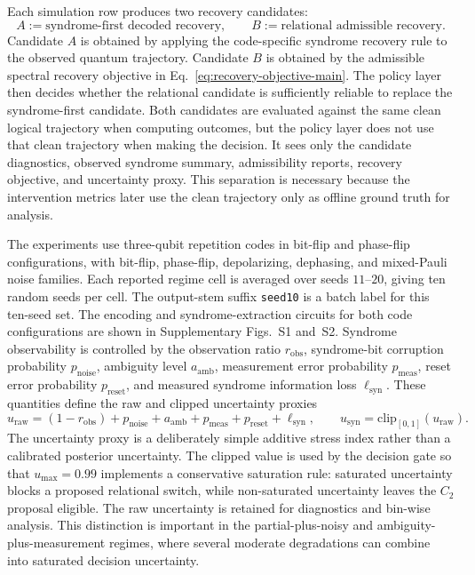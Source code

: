 \documentclass{iopjournal}
\begin{document}
Each simulation row produces two recovery candidates:
\begin{equation}
A := \text{syndrome-first decoded recovery},
\qquad
B := \text{relational admissible recovery}.
\end{equation}
Candidate $A$ is obtained by applying the code-specific syndrome recovery rule to
the observed quantum trajectory. Candidate $B$ is obtained by the admissible
spectral recovery objective in Eq.~\eqref{eq:recovery-objective-main}. The policy
layer then decides whether the relational candidate is sufficiently reliable to
replace the syndrome-first candidate.
Both candidates are evaluated against the same clean logical trajectory when
computing outcomes, but the policy layer does not use that clean trajectory when
making the decision. It sees only the candidate diagnostics, observed syndrome
summary, admissibility reports, recovery objective, and uncertainty proxy. This
separation is necessary because the intervention metrics later use the clean
trajectory only as offline ground truth for analysis.

The experiments use three-qubit repetition codes in bit-flip and phase-flip
configurations, with bit-flip, phase-flip, depolarizing, dephasing, and mixed-Pauli
noise families. Each reported regime cell is averaged over seeds $11$--$20$,
giving ten random seeds per cell. The output-stem suffix \texttt{seed10} is a
batch label for this ten-seed set. The encoding and syndrome-extraction circuits
for both code configurations are shown in Supplementary Figs.~S1 and~S2.
Syndrome observability is controlled by the observation ratio
$r_{\mathrm{obs}}$, syndrome-bit corruption probability $p_{\mathrm{noise}}$,
ambiguity level $a_{\mathrm{amb}}$, measurement error probability $p_{\mathrm{meas}}$,
reset error probability $p_{\mathrm{reset}}$, and measured syndrome information loss
$\ell_{\mathrm{syn}}$. These quantities define the raw and clipped uncertainty
proxies
\begin{equation}
u_{\mathrm{raw}}
=
(1-r_{\mathrm{obs}})
+p_{\mathrm{noise}}
+a_{\mathrm{amb}}
+p_{\mathrm{meas}}
+p_{\mathrm{reset}}
+\ell_{\mathrm{syn}},
\qquad
u_{\mathrm{syn}}=\mathrm{clip}_{[0,1]}(u_{\mathrm{raw}}).
\end{equation}
The uncertainty proxy is a deliberately simple additive stress index rather than a
calibrated posterior uncertainty. The clipped value is used by the decision gate
so that $u_{\max}=0.99$ implements a conservative saturation rule: saturated
uncertainty blocks a proposed relational switch, while non-saturated uncertainty
leaves the $C_2$ proposal eligible. The raw uncertainty is retained for diagnostics
and bin-wise analysis. This distinction is important in the partial-plus-noisy and
ambiguity-plus-measurement regimes, where several moderate degradations can combine
into saturated decision uncertainty.
\end{document}
